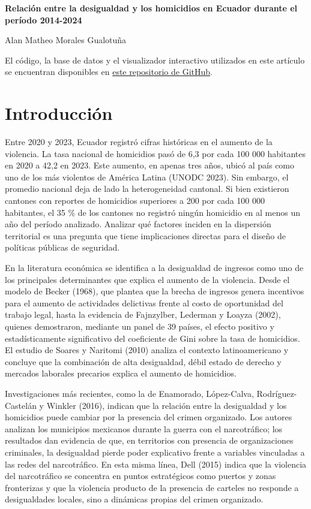 \documentclass[12pt,a4paper]{article}
\begin{document}
\begin{center}
\textbf{Relación entre la desigualdad y los homicidios en Ecuador durante el período 2014-2024}

Alan Matheo Morales Gualotuña
\end{center}

\vspace{0.5cm}

El código, la base de datos y el visualizador interactivo utilizados en este artículo se encuentran disponibles en \href{https://github.com/matheomg/Relaci-n-entre-la-desigualdad-y-homicidios}{este repositorio de GitHub}.

\section*{Introducción}

Entre 2020 y 2023, Ecuador registró cifras históricas en el aumento de la violencia. La tasa nacional de homicidios pasó de 6,3 por cada 100 000 habitantes en 2020 a 42,2 en 2023. Este aumento, en apenas tres años, ubicó al país como uno de los más violentos de América Latina (UNODC 2023). Sin embargo, el promedio nacional deja de lado la heterogeneidad cantonal. Si bien existieron cantones con reportes de homicidios superiores a 200 por cada 100 000 habitantes, el 35 \% de los cantones no registró ningún homicidio en al menos un año del período analizado. Analizar qué factores inciden en la dispersión territorial es una pregunta que tiene implicaciones directas para el diseño de políticas públicas de seguridad.

En la literatura económica se identifica a la desigualdad de ingresos como uno de los principales determinantes que explica el aumento de la violencia. Desde el modelo de Becker (1968), que plantea que la brecha de ingresos genera incentivos para el aumento de actividades delictivas frente al costo de oportunidad del trabajo legal, hasta la evidencia de Fajnzylber, Lederman y Loayza (2002), quienes demostraron, mediante un panel de 39 países, el efecto positivo y estadísticamente significativo del coeficiente de Gini sobre la tasa de homicidios. El estudio de Soares y Naritomi (2010) analiza el contexto latinoamericano y concluye que la combinación de alta desigualdad, débil estado de derecho y mercados laborales precarios explica el aumento de homicidios.

Investigaciones más recientes, como la de Enamorado, López-Calva, Rodríguez-Castelán y Winkler (2016), indican que la relación entre la desigualdad y los homicidios puede cambiar por la presencia del crimen organizado. Los autores analizan los municipios mexicanos durante la guerra con el narcotráfico; los resultados dan evidencia de que, en territorios con presencia de organizaciones criminales, la desigualdad pierde poder explicativo frente a variables vinculadas a las redes del narcotráfico. En esta misma línea, Dell (2015) indica que la violencia del narcotráfico se concentra en puntos estratégicos como puertos y zonas fronterizas y que la violencia producto de la presencia de carteles no responde a desigualdades locales, sino a dinámicas propias del crimen organizado.
\end{document}
